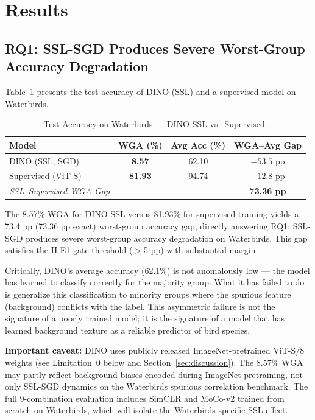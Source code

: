\section{Results}
\label{sec:results}

\subsection{RQ1: SSL-SGD Produces Severe Worst-Group Accuracy Degradation}

Table~\ref{tab:main_results} presents the test accuracy of DINO (SSL) and a supervised model on Waterbirds.

\begin{table}[t]
\caption{Test Accuracy on Waterbirds --- DINO SSL vs.\ Supervised.}
\label{tab:main_results}
\begin{center}
\begin{tabular}{lccc}
\toprule
\textbf{Model} & \textbf{WGA (\%)} & \textbf{Avg Acc (\%)} & \textbf{WGA--Avg Gap} \\
\midrule
DINO (SSL, SGD) & \textbf{8.57} & 62.10 & $-53.5$ pp \\
Supervised (ViT-S) & \textbf{81.93} & 94.74 & $-12.8$ pp \\
\midrule
\textit{SSL--Supervised WGA Gap} & --- & --- & \textbf{73.36 pp} \\
\bottomrule
\end{tabular}
\end{center}
\end{table}

The 8.57\% WGA for DINO SSL versus 81.93\% for supervised training yields a 73.4 pp (73.36 pp exact) worst-group accuracy gap, directly answering RQ1: SSL-SGD produces severe worst-group accuracy degradation on Waterbirds. This gap satisfies the H-E1 gate threshold ($>$5 pp) with substantial margin.

Critically, DINO's average accuracy (62.1\%) is not anomalously low --- the model has learned to classify correctly for the majority group. What it has failed to do is generalize this classification to minority groups where the spurious feature (background) conflicts with the label. This asymmetric failure is not the signature of a poorly trained model; it is the signature of a model that has learned background texture as a reliable predictor of bird species.

\textbf{Important caveat:} DINO uses publicly released ImageNet-pretrained ViT-S/8 weights (see Limitation~0 below and Section~\ref{sec:discussion}). The 8.57\% WGA may partly reflect background biases encoded during ImageNet pretraining, not only SSL-SGD dynamics on the Waterbirds spurious correlation benchmark. The full 9-combination evaluation includes SimCLR and MoCo-v2 trained from scratch on Waterbirds, which will isolate the Waterbirds-specific SSL effect.


